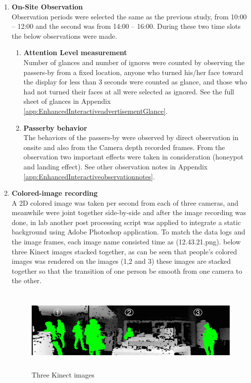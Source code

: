 \begin{enumerate}
\item \textbf{On-Site Observation} \\
Observation periods were selected the same as the previous study, from 10:00 – 12:00 and the second was from 14:00 – 16:00. During these two time slots the below observations were made.

\begin{enumerate}
\item \textbf{Attention Level measurement} \\
Number of glances and number of ignores were counted by observing the passers-by from a fixed location, anyone who turned his/her face toward the display for less than 3 seconds were counted as glance, and those who had not turned their faces at all were selected as ignored. See the full sheet of glances in Appendix \ref{app:EnhancedInteractiveadvertisementGlance}.

\item \textbf{Passerby behavior} \\
The behaviors of the passers-by were observed by direct observation in onsite and also from the Camera depth recorded frames. From the observation two important effects were taken in consideration (honeypot and landing effect). See other observation notes in Appendix \ref{app:EnhancedInteractiveobservationnotes}.


\end{enumerate}

\item \textbf{Colored-image recording} \\
A 2D colored image was taken per second from each of three cameras, and meanwhile were joint together side-by-side and after the image recording was done, in lab another post processing script was applied to integrate a static background using Adobe Photoshop application. To match the data logs and the image frames, each image name consisted time as (12.43.21.png).
below three Kinect images stacked together, as can be seen that people's colored images was rendered on the images (1,2 and 3) these images are stacked together so that the transition of one person be smooth from one camera to the other.


\begin{minipage}{0.95\textwidth}
\begin{flushright}
\begin{figure}[H]
   \centering
    \includegraphics[width=\textwidth,height=40mm]{Figures/9/stacked_image}%
    \caption{Three Kinect images}%
    \label{fig:threekinectimages}%
\end{figure}
\end{flushright}
\end{minipage}



\end{enumerate}
